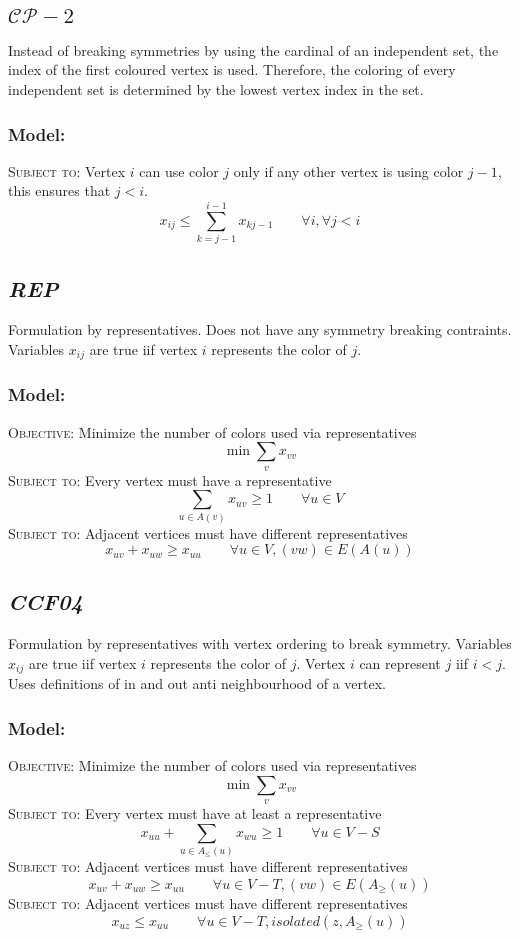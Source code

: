 \documentclass[a4paper]{article}
\newenvironment{lpmodel}{\subsubsection*{Model:} }{ }
\newcommand{\lpobjective}[2]{\textsc{Objective:} #1 \[ #2 \]}
\newcommand{\lprestriction}[3]{\textsc{Subject to:} #1 \[ #2 \qquad #3 \]}
\begin{document}
\subsection{$\mathcal{CP}-2$}

Instead of breaking symmetries by using the cardinal of an independent set, the index of the first coloured vertex is used. Therefore, the coloring of every independent set is determined by the lowest vertex index in the set.

\begin{lpmodel}
\lprestriction{Vertex $i$ can use color $j$ only if any other vertex is using color $j-1$, this ensures that $j < i$.}
{x_{ij} \leq \sum _{k=j-1}^{i-1} x_{kj-1}}{\forall i, \forall j < i}
\end{lpmodel}

\subsection{\textsl{REP}}

Formulation by representatives. Does not have any symmetry breaking contraints. Variables $x_{ij}$ are true iif vertex $i$ represents the color of $j$. 

\begin{lpmodel}
\lpobjective{Minimize the number of colors used via representatives}
{\min \sum_v x_{vv}}
\lprestriction{Every vertex must have a representative}
{\sum _{u \in A(v)} x_{uv} \geq 1}{\forall u \in V}
\lprestriction{Adjacent vertices must have different representatives}
{x_{uv} + x_{uw} \geq x_{uu}}{\forall u \in V, (vw) \in E(A(u))}
\end{lpmodel}

\subsection{\textsl{CCF04}}

Formulation by representatives with vertex ordering to break symmetry. Variables $x_{ij}$ are true iif vertex $i$ represents the color of $j$. Vertex $i$ can represent $j$ iif $i < j$. Uses definitions of in and out anti neighbourhood of a vertex.

\begin{lpmodel}
\lpobjective{Minimize the number of colors used via representatives}
{\min \sum_v x_{vv}}
\lprestriction{Every vertex must have at least a representative}
{x_{uu} + \sum _{u \in A_\leq(u)} x_{wu} \geq 1}{\forall u \in V - S}
\lprestriction{Adjacent vertices must have different representatives}
{x_{uv} + x_{uw} \geq x_{uu}}{\forall u \in V - T, (vw) \in E(A_\geq(u))}
\lprestriction{Adjacent vertices must have different representatives}
{x_{uz} \leq x_{uu}}{\forall u \in V - T, isolated(z,A_\geq(u))}
\end{lpmodel}
\end{document}
